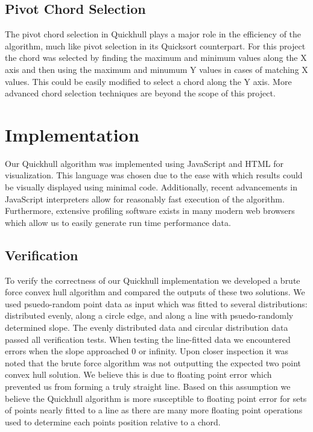 \documentclass[11pt]{article}
\begin{document}
\subsection{Pivot Chord Selection}
The pivot chord selection in Quickhull plays a major role in the efficiency of the algorithm, much like pivot selection in its Quicksort counterpart. For this project the chord was selected by finding the maximum and minimum values along the X axis and then using the maximum and minumum Y values in cases of matching X values. This could be easily modified to select a chord along the Y axis. More advanced chord selection techniques are beyond the scope of this project.

\section{Implementation}
Our Quickhull algorithm was implemented using JavaScript and HTML for visualization. This language was chosen due to the ease with which results could be visually displayed using minimal code. Additionally, recent advancements in JavaScript interpreters allow for reasonably fast execution of the algorithm. Furthermore, extensive profiling software exists in many modern web browsers which allow us to easily generate run time performance data.

\subsection{Verification}
To verify the correctness of our Quickhull implementation we developed a brute force convex hull algorithm and compared the outputs of these two solutions. We used psuedo-random point data as input which was fitted to several distributions: distributed evenly, along a circle edge, and along a line with psuedo-randomly determined slope. The evenly distributed data and circular distribution data passed all verification tests. When testing the line-fitted data we encountered errors when the slope approached 0 or infinity. Upon closer inspection it was noted that the brute force algorithm was not outputting the expected two point convex hull solution. We believe this is due to floating point error which prevented us from forming a truly straight line. Based on this assumption we believe the Quickhull algorithm is more susceptible to floating point error for sets of points nearly fitted to a line as there are many more floating point operations used to determine each points position relative to a chord.
\end{document}
